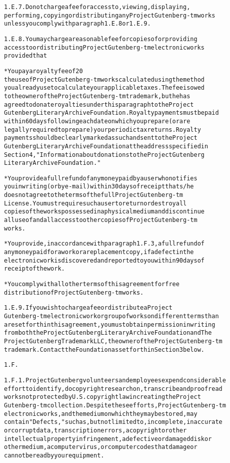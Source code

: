 \documentclass[12pt]{book}[2005/09/16]
\newenvironment{PGtext}{%
\begin{alltt}
%****
\fontsize{8.1}{10}\ttfamily\selectfont}%
{\end{alltt}}
\begin{document}
\begin{PGtext}
1.E.7. Do not charge a fee for access to, viewing, displaying,
performing, copying or distributing any Project Gutenberg-tm works
unless you comply with paragraph 1.E.8 or 1.E.9.

1.E.8. You may charge a reasonable fee for copies of or providing
access to or distributing Project Gutenberg-tm electronic works
provided that

* You pay a royalty fee of 20%
  the use of Project Gutenberg-tm works calculated using the method
  you already use to calculate your applicable taxes. The fee is owed
  to the owner of the Project Gutenberg-tm trademark, but he has
  agreed to donate royalties under this paragraph to the Project
  Gutenberg Literary Archive Foundation. Royalty payments must be paid
  within 60 days following each date on which you prepare (or are
  legally required to prepare) your periodic tax returns. Royalty
  payments should be clearly marked as such and sent to the Project
  Gutenberg Literary Archive Foundation at the address specified in
  Section 4, "Information about donations to the Project Gutenberg
  Literary Archive Foundation."

* You provide a full refund of any money paid by a user who notifies
  you in writing (or by e-mail) within 30 days of receipt that s/he
  does not agree to the terms of the full Project Gutenberg-tm
  License. You must require such a user to return or destroy all
  copies of the works possessed in a physical medium and discontinue
  all use of and all access to other copies of Project Gutenberg-tm
  works.

* You provide, in accordance with paragraph 1.F.3, a full refund of
  any money paid for a work or a replacement copy, if a defect in the
  electronic work is discovered and reported to you within 90 days of
  receipt of the work.

* You comply with all other terms of this agreement for free
  distribution of Project Gutenberg-tm works.

1.E.9. If you wish to charge a fee or distribute a Project
Gutenberg-tm electronic work or group of works on different terms than
are set forth in this agreement, you must obtain permission in writing
from both the Project Gutenberg Literary Archive Foundation and The
Project Gutenberg Trademark LLC, the owner of the Project Gutenberg-tm
trademark. Contact the Foundation as set forth in Section 3 below.

1.F.

1.F.1. Project Gutenberg volunteers and employees expend considerable
effort to identify, do copyright research on, transcribe and proofread
works not protected by U.S. copyright law in creating the Project
Gutenberg-tm collection. Despite these efforts, Project Gutenberg-tm
electronic works, and the medium on which they may be stored, may
contain "Defects," such as, but not limited to, incomplete, inaccurate
or corrupt data, transcription errors, a copyright or other
intellectual property infringement, a defective or damaged disk or
other medium, a computer virus, or computer codes that damage or
cannot be read by your equipment.


\end{PGtext}
\end{document}
